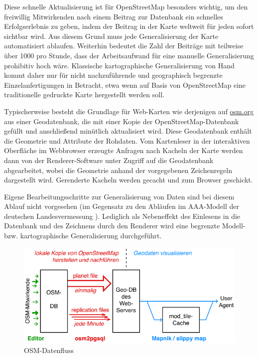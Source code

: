 \documentclass[../main/thesis.tex]{subfiles}
\begin{document}
Diese schnelle Aktualisierung ist für OpenStreetMap besonders wichtig, um den freiwillig Mitwirkenden nach einem Beitrag zur Datenbank ein schnelles Erfolgserlebnis zu geben, indem der Beitrag in der Karte weltweit für jeden sofort sichtbar wird.
Aus diesem Grund muss jede Generalisierung der Karte automatisiert ablaufen. Weiterhin bedeutet die Zahl der Beiträge mit teilweise über 1000  pro Stunde, 
dass der Arbeitsaufwand für eine manuelle Generalisierung prohibitiv hoch wäre. Klassische kartographische Generalisierung von Hand kommt daher nur für nicht nachzuführende und geographisch begrenzte Einzelanfertigungen in Betracht, etwa wenn auf Basis von OpenStreetMap eine traditionelle gedruckte Karte hergestellt werden soll.

Typischerweise besteht die Grundlage für Web-Karten wie derjenigen auf \url{osm.org} aus einer Geodatenbank, die mit einer Kopie der OpenStreetMap-Datenbank gefüllt und anschließend minütlich aktualisiert wird. Diese Geodatenbank enthält die Geometrie und Attribute der Rohdaten. Vom Kartenleser in der interaktiven Oberfläche im Webbrowser erzeugte Anfragen nach Kacheln der Karte werden dann von der Renderer-Software unter Zugriff auf die Geodatenbank abgearbeitet, wobei die Geometrie anhand der vorgegebenen Zeichenregeln dargestellt wird. Gerenderte Kacheln werden gecacht und zum Browser geschickt.

Eigene Bearbeitungsschritte zur Generalisierung von Daten sind bei diesem Ablauf nicht vorgesehen (im Gegensatz zu den Abläufen im AAA-Modell der deutschen Landesvermessung ). Lediglich als Nebeneffekt des Einlesens in die Datenbank und des Zeichnens durch den Renderer wird eine begrenzte Modell- bzw. kartographische Generalisierung durchgeführt. 


\begin{figure}[ht]
    \centering
    \includegraphics[width=\ScaleIfNeeded]{../chapter2/osm-datenfluss}
    \caption{OSM-Datenfluss}\label{fig:osm-datenfluss}
\end{figure}
\end{document}
